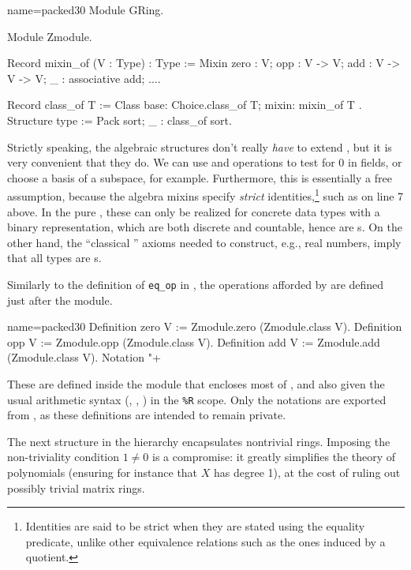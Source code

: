 \begin{coq}{name=packed30}{}
Module GRing.

Module Zmodule.

Record mixin_of (V : Type) : Type := Mixin {
  zero : V; opp : V -> V; add : V -> V -> V;
  _ : associative add;
  ...}.

Record class_of T := Class { base: Choice.class_of T; mixin: mixin_of T }.
Structure type := Pack {sort; _ : class_of sort}.
\end{coq}

Strictly speaking, the \mcbMC{} algebraic structures don't really
\emph{have} to extend , but it is very convenient that
they do.  We can use  and  operations to test
for 0 in fields, or choose a basis of a subspace, for example.
Furthermore, this is essentially a free assumption, because the
\mcbMC{} algebra mixins specify \emph{strict} identities,\footnote{Identities
are said to be strict when they are stated using the equality predicate,
unlike other equivalence relations such as the ones induced by a quotient.}
 such as
 on line 7 above. In the pure \mcbCIC{}, these can only
be realized for concrete data types with a binary representation,
which are both discrete and countable, hence are s.  On
the other hand, the ``classical \mcbCIC{}'' axioms needed to construct,
e.g., real numbers, imply that all types are s.

Similarly to the definition of \lstinline/eq_op/ in , the
operations afforded by  are defined just after the
 module.

\begin{coq}{name=packed30}{}
Definition zero V := Zmodule.zero (Zmodule.class V).
Definition opp V := Zmodule.opp (Zmodule.class V).
Definition add V := Zmodule.add (Zmodule.class V).
Notation "+%
\end{coq}

These are defined inside the  module that encloses most of
, and also given the usual arithmetic syntax (,
, ) in the \lstinline/%R/
scope. Only the notations are
exported from , as these definitions are intended to remain
private.


The next structure in the hierarchy encapsulates nontrivial rings.
Imposing the non-triviality condition $1 \neq 0$ is a compromise:
it greatly simplifies the theory of polynomials (ensuring for instance that
$X$ has degree 1), at the cost of ruling out possibly trivial matrix rings.

